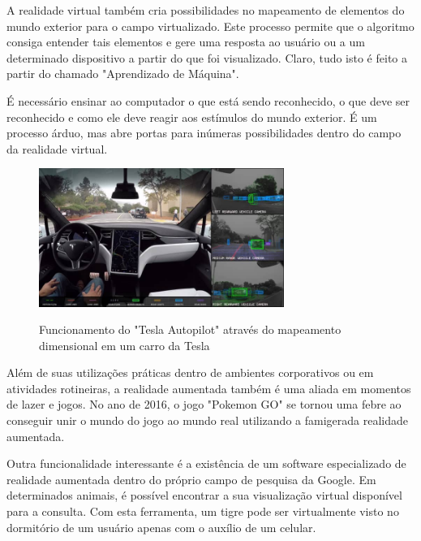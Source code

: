 \documentclass[a4paper, 12pt]{article}
\begin{document}
A realidade virtual também cria possibilidades no mapeamento de elementos do mundo exterior para o campo virtualizado. Este processo permite que o algoritmo consiga entender tais elementos e gere uma resposta ao usuário ou a um determinado dispositivo a partir do que foi visualizado.
Claro, tudo isto é feito a partir do chamado "Aprendizado de Máquina". 

É necessário ensinar ao computador o que está sendo reconhecido, o que deve ser reconhecido e como ele deve reagir aos estímulos do mundo exterior. É um processo árduo, mas abre portas para inúmeras possibilidades dentro do campo da realidade virtual.

\begin{figure}[H]
    \centering
    \includegraphics[width=8cm]{imagens/tesla.jpg}
    \caption{Funcionamento do "Tesla Autopilot" através do mapeamento dimensional em um carro da Tesla}
    \label{fig:my_label}
    \citep{tesla}
\end{figure}

Além de suas utilizações práticas dentro de ambientes corporativos ou em atividades rotineiras, a realidade aumentada também é uma aliada em momentos de lazer e jogos. No ano de 2016, o jogo "Pokemon GO" se tornou uma febre ao conseguir unir o mundo do jogo ao mundo real utilizando a famigerada realidade aumentada. 

Outra funcionalidade interessante é a existência de um software especializado de realidade aumentada dentro do próprio campo de pesquisa da Google. Em determinados animais, é possível encontrar a sua visualização virtual disponível para a consulta. Com esta ferramenta, um tigre pode ser virtualmente visto no dormitório de um usuário apenas com o auxílio de um celular. 
\end{document}
